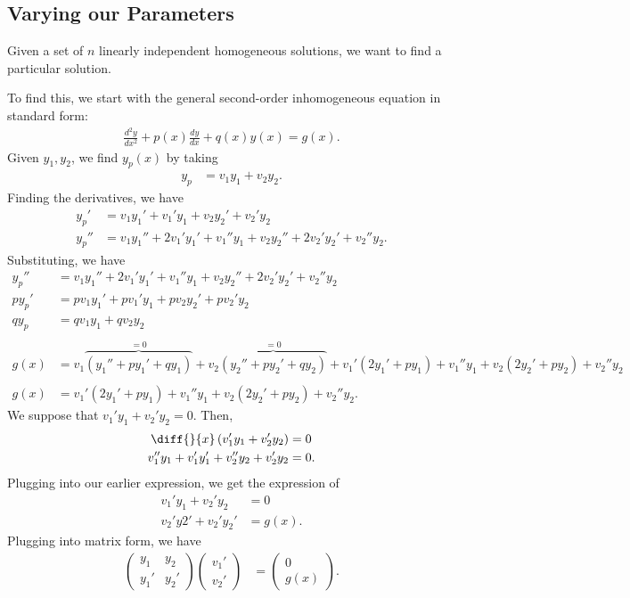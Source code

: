 \documentclass[10pt]{mypackage}
\begin{document}
\subsection{Varying our Parameters}%
Given a set of $n$ linearly independent homogeneous solutions, we want to find a particular solution.\newline

To find this, we start with the general second-order inhomogeneous equation in standard form:
\begin{align*}
  \frac{d^2y}{dx^2} + p(x)\frac{dy}{dx} + q(x)y(x) = g(x).
\end{align*}
Given $y_1,y_2$, we find $y_p(x)$ by taking
\begin{align*}
  y_p &= v_1y_1 + v_2y_2.
\end{align*}
Finding the derivatives, we have
\begin{align*}
  y_p' &= v_1y_1' + v_1'y_1 + v_2y_2' + v_2'y_2\\
  y_p'' &= v_1y_1'' + 2v_1'y_1' + v_1''y_1 + v_2y_2'' + 2v_2'y_2' + v_2''y_2.
\end{align*}
Substituting, we have
\begin{align*}
  y_p'' &= v_1y_1'' + 2v_1'y_1' + v_1''y_1 + v_2y_2'' + 2v_2'y_2' + v_2''y_2\\
  py_p' &= pv_1y_1' + pv_1'y_1 + pv_2y_2' + pv_2'y_2\\
  qy_p &= qv_1y_1 + qv_2y_2\\
  \\
  g(x) &= v_1\overbrace{\left(y_1'' + py_1' + qy_1\right)}^{=0} + v_2\overbrace{\left(y_2'' + py_2' + qy_2\right)}^{=0} + v_1'\left(2y_1'+py_1\right) + v_1''y_1 + v_2\left(2y_2' + py_2\right) + v_2''y_2\\
       \\
  g(x) &= v_1'\left(2y_1' + py_1\right) + v_1''y_1 + v_2\left(2y_2' + py_2\right) + v_2''y_2.
\end{align*}
We suppose that $v_1'y_1 + v_2'y_2 = 0$. Then,
\begin{align*}
  \diff{}{x}\left(v_1'y_1 + v_2'y_2\right) &= 0\\
  v_1''y_1 + v_1'y_1' + v_2''y_2 + v_2'y_2 &= 0.
\end{align*}
Plugging into our earlier expression, we get the expression of
\begin{align*}
  v_1'y_1 + v_2'y_2 &= 0\\
  v_2'y2' + v_2'y_2' &= g(x).
\end{align*}
Plugging into matrix form, we have
\begin{align*}
  \begin{pmatrix}y_1 & y_2 \\ y_1' & y_2'\end{pmatrix} \begin{pmatrix}v_1'\\v_2'\end{pmatrix} &= \begin{pmatrix}0\\g(x)\end{pmatrix}.
\end{align*}
\end{document}
